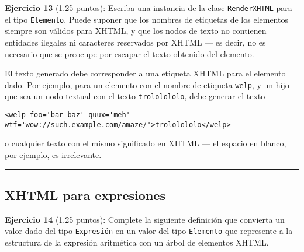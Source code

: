 \textbf{Ejercicio 13} (1.25 puntos): Escriba una instancia de la clase
\texttt{RenderXHTML} para el tipo \texttt{Elemento}. Puede suponer que
los nombres de etiquetas de los elementos siempre son válidos para
XHTML, y que los nodos de texto no contienen entidades ilegales ni
caracteres reservados por XHTML --- es decir, no es necesario que se
preocupe por escapar el texto obtenido del elemento.

El texto generado debe corresponder a una etiqueta XHTML para el
elemento dado. Por ejemplo, para un elemento con el nombre de etiqueta
\texttt{welp}, y un hijo que sea un nodo textual con el texto
\texttt{trololololo}, debe generar el texto

\begin{verbatim}
<welp foo='bar baz' quux='meh' wtf='wow://such.example.com/amaze/'>trololololo</welp>
\end{verbatim}

o cualquier texto con el mismo significado en XHTML --- el espacio en
blanco, por ejemplo, es irrelevante.

\begin{Shaded}
\begin{Highlighting}[]
   
    \FunctionTok{=}   
           \OtherTok{->} 
           \OtherTok{->}  \FunctionTok{++} \FunctionTok{++} \FunctionTok{++}   \FunctionTok{++} \FunctionTok{++}  \FunctionTok{++} \FunctionTok{++}  
\end{Highlighting}
\end{Shaded}

\begin{center}\rule{3in}{0.4pt}\end{center}

\subsection{XHTML para expresiones}\label{xhtml-para-expresiones}

\textbf{Ejercicio 14} (1.25 puntos): Complete la siguiente definición
que convierta un valor dado del tipo \texttt{Expresión} en un valor del
tipo \texttt{Elemento} que represente a la estructura de la expresión
aritmética con un árbol de elementos XHTML.

